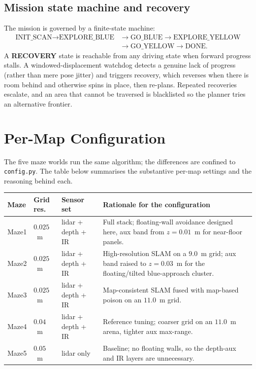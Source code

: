 \documentclass[11pt,a4paper]{article}
\newcommand{\code}[1]{\colorbox{codegray}{\texttt{\small #1}}}
\begin{document}
\subsection{Mission state machine and recovery}
The mission is governed by a finite-state machine:
\begin{align*}
\text{INIT\_SCAN} \rightarrow \text{EXPLORE\_BLUE} &\rightarrow \text{GO\_BLUE}
\rightarrow \text{EXPLORE\_YELLOW} \\
&\rightarrow \text{GO\_YELLOW} \rightarrow \text{DONE.}
\end{align*}
A \textbf{RECOVERY} state is reachable from any driving state when forward
progress stalls. A windowed-displacement watchdog detects a genuine lack of
progress (rather than mere pose jitter) and triggers recovery, which reverses
when there is room behind and otherwise spins in place, then re-plans. Repeated
recoveries escalate, and an area that cannot be traversed is blacklisted so the
planner tries an alternative frontier.

\section{Per-Map Configuration}
\label{sec:config}

The five maze worlds run the same algorithm; the differences are confined to
\code{config.py}. The table below summarises the substantive per-map settings
and the reasoning behind each.

\begin{center}
\small
\begin{tabular}{@{}p{1.1cm}p{1.3cm}p{2.5cm}p{7.6cm}@{}}
\toprule
\textbf{Maze} & \textbf{Grid res.} & \textbf{Sensor set} & \textbf{Rationale for the configuration} \\
\midrule
Maze1 & $0.025$~m & lidar + depth + IR & Full stack; floating-wall avoidance designed here, aux band from $z=0.01$~m for near-floor panels. \\
Maze2 & $0.025$~m & lidar + depth + IR & High-resolution SLAM on a $9.0$~m grid; aux band raised to $z=0.03$~m for the floating/tilted blue-approach cluster. \\
Maze3 & $0.025$~m & lidar + depth + IR & Map-consistent SLAM fused with map-based poison on an $11.0$~m grid. \\
Maze4 & $0.04$~m & lidar + depth + IR & Reference tuning; coarser grid on an $11.0$~m arena, tighter aux max-range. \\
Maze5 & $0.05$~m & lidar only & Baseline; no floating walls, so the depth-aux and IR layers are unnecessary. \\
\bottomrule
\end{tabular}
\end{center}
\end{document}
